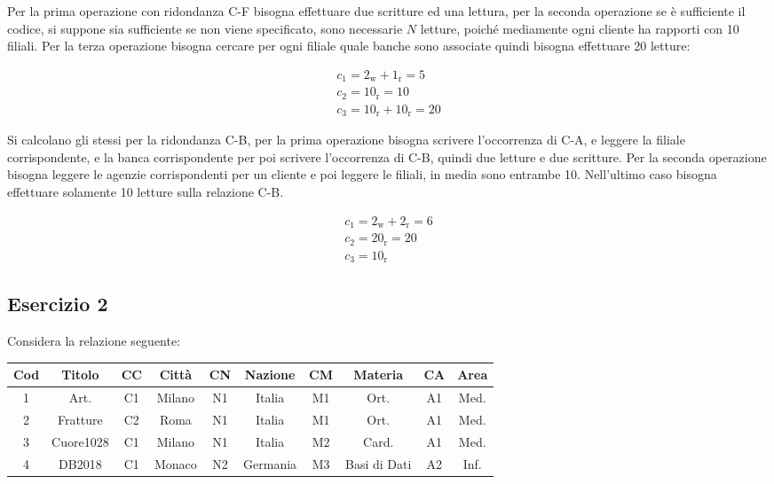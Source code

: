 \documentclass{article}
\numberwithin{equation}{subsection}
\begin{document}

Per la prima operazione con ridondanza C-F bisogna effettuare due scritture ed una lettura, per la seconda operazione se è sufficiente il codice, si suppone sia 
sufficiente se non viene specificato, sono necessarie $N$ letture, poiché mediamente ogni cliente ha rapporti con 10 filiali. Per la terza operazione bisogna 
cercare per ogni filiale quale banche sono associate quindi bisogna effettuare 20 letture:

\begin{gather*}
    c_1=2_\text{w}+1_\text{r}=5\\
    c_2=10_\text{r}=10\\
    c_3=10_\text{r}+10_\text{r}=20
\end{gather*}

Si calcolano gli stessi per la ridondanza C-B, per la prima operazione bisogna scrivere l'occorrenza di C-A, e leggere la filiale corrispondente, e la banca corrispondente 
per poi scrivere l'occorrenza di C-B, quindi due letture e due scritture. Per la seconda operazione bisogna leggere le agenzie corrispondenti per un cliente e poi leggere 
le filiali, in media sono entrambe 10. Nell'ultimo caso bisogna effettuare solamente 10 letture sulla relazione C-B. 

\begin{gather*}
    c_1=2_\text{w}+2_\text{r}=6\\
    c_2=20_\text{r}=20\\
    c_3=10_\text{r}
\end{gather*}


\subsection{Esercizio 2}

Considera la relazione seguente:

\begin{center}
    \begin{tabular}{|c|c|c|c|c|c|c|c|c|c|}
        \hline
        Cod & Titolo & CC & Città & CN & Nazione & CM & Materia & CA & Area\\
        \hline
        1 & Art. & C1 & Milano & N1 & Italia & M1&Ort.&A1&Med.\\
        \hline
        2&Fratture&C2&Roma&N1&Italia&M1&Ort.&A1&Med.\\\hline
        3&Cuore1028&C1&Milano&N1&Italia&M2&Card.&A1&Med.\\\hline
        4&DB2018&C1&Monaco&N2&Germania&M3&Basi di Dati&A2&Inf.\\\hline
    \end{tabular}
\end{center}
\end{document}
